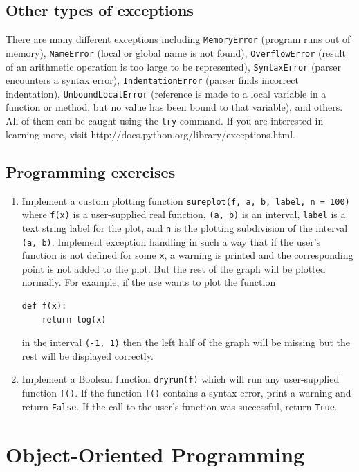 \subsection{Other types of exceptions}

There are many different exceptions including {\tt MemoryError} (program runs out of memory),
{\tt NameError} (local or global name is not found), {\tt OverflowError} (result of an arithmetic 
operation is too large to be represented), {\tt SyntaxError} (parser encounters a syntax error),
{\tt IndentationError} (parser finds incorrect indentation), {\tt UnboundLocalError} (reference 
is made to a local variable in a function or method, but no value has been bound to that variable),
and others. All of them can be caught using the {\tt try} command. If you are interested in 
learning more, visit http://docs.python.org/library/exceptions.html.



\subsection{Programming exercises}

\begin{enumerate}
\item Implement a custom plotting function {\tt sureplot(f, a, b, label, n = 100)} where {\tt f(x)} is 
      a user-supplied real function, {\tt (a, b)} is an interval, {\tt label} 
      is a text string label for the plot, and {\tt n} is the plotting subdivision of the interval {\tt (a, b)}.
      Implement exception handling in such a way that if the user's function is not defined for some {\tt x}, 
      a warning is printed and the corresponding point is not added to the plot. But the rest of the graph
      will be plotted normally. For example, if the use wants to plot the function 
\begin{verbatim}
def f(x):
    return log(x)
\end{verbatim}
in the interval {\tt (-1, 1)} then the left half of the graph will be missing but the rest 
will be displayed correctly.
\item Implement a Boolean function {\tt dryrun(f)} which will run any user-supplied function {\tt f()}.
      If the function {\tt f()} contains a syntax error, print a warning and return {\tt False}. If the 
      call to the user's function was successful, return {\tt True}.
\end{enumerate}

\section{Object-Oriented Programming}

